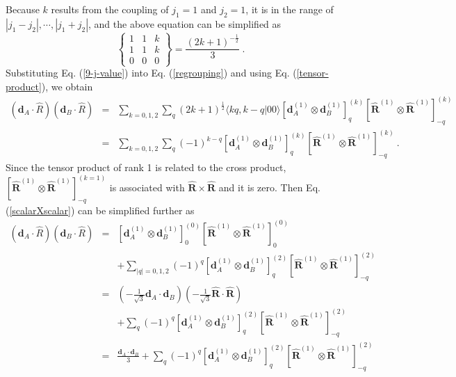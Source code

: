 Because $k$ results from the coupling of $j_{1}=1$ and $j_{2}=1$, it is in the range of $|j_{1}-j_{2}|, \cdots, |j_{1}+j_{2}|$, and the above equation can be simplified as
\begin{equation}
\left\{
\begin{array}{ccc}
1& 1&k \\
1&1&k \\
0&0&0 
\end{array}
\right\} = \frac{(2k + 1)^{-\frac{1}{2}}}{3} \ . \label{9-j-value}
\end{equation}  
Substituting Eq. (\ref{9-j-value}) into Eq. (\ref{regrouping}) and using Eq. (\ref{tensor-product}), we obtain
\begin{eqnarray}
(\mathbf{d}_{A}\cdot\hat{R})(\mathbf{d}_{B}\cdot\hat{R})&=&\sum_{k=0,1,2}\sum_{q}(2k+1)^{\frac{1}{2}}\langle k q, k -q | 00 \rangle\left[ \mathbf{d}_{A}^{(1)} \otimes \mathbf{d}_{B}^{(1)} \right]^{(k)}_{q} \left[ \mathbf{\hat{R}}^{(1)} \otimes \mathbf{\hat{R}}^{(1)} \right]^{(k)}_{-q}    \nonumber \\
&=& \sum_{k=0,1,2}\sum_{q} (-1)^{k-q} \left[ \mathbf{d}_{A}^{(1)} \otimes \mathbf{d}_{B}^{(1)} \right]^{(k)}_{q} \left[ \mathbf{\hat{R}}^{(1)} \otimes \mathbf{\hat{R}}^{(1)} \right]^{(k)}_{-q} \ . \label{scalarXscalar}
\end{eqnarray}
Since the tensor product of rank 1 is related to the cross product, $\left[ \mathbf{\hat{R}}^{(1)} \otimes \mathbf{\hat{R}}^{(1)} \right]^{(k=1)}_{-q}$ is associated with $\mathbf{\hat{R}}\times\mathbf{\hat{R}}$ and it is zero. Then Eq. (\ref{scalarXscalar}) can be simplified further as
\begin{eqnarray}
(\mathbf{d}_{A}\cdot\hat{R})(\mathbf{d}_{B}\cdot\hat{R})&=&\left[ \mathbf{d}_{A}^{(1)} \otimes \mathbf{d}_{B}^{(1)} \right]^{(0)}_{0} \left[ \mathbf{\hat{R}}^{(1)} \otimes \mathbf{\hat{R}}^{(1)} \right]^{(0)}_{0} \nonumber \\
& & + \sum_{|q|=0,1,2} (-1)^{q} \left[ \mathbf{d}_{A}^{(1)} \otimes \mathbf{d}_{B}^{(1)} \right]^{(2)}_{q} \left[ \mathbf{\hat{R}}^{(1)} \otimes \mathbf{\hat{R}}^{(1)} \right]^{(2)}_{-q} \nonumber \\
&=& (-\frac{1}{\sqrt{3}} \mathbf{d}_{A}\cdot \mathbf{d}_{B})(-\frac{1}{\sqrt{3}}\mathbf{\hat{R}}\cdot\mathbf{\hat{R}} ) \nonumber \\
& & +  \sum_{q} (-1)^{q} \left[ \mathbf{d}_{A}^{(1)} \otimes \mathbf{d}_{B}^{(1)} \right]^{(2)}_{q} \left[ \mathbf{\hat{R}}^{(1)} \otimes \mathbf{\hat{R}}^{(1)} \right]^{(2)}_{-q} \nonumber \\
&=& \frac{\mathbf{d}_{A}\cdot \mathbf{d}_{B}}{3}+  \sum_{q} (-1)^{q} \left[ \mathbf{d}_{A}^{(1)} \otimes \mathbf{d}_{B}^{(1)} \right]^{(2)}_{q} \left[ \mathbf{\hat{R}}^{(1)} \otimes \mathbf{\hat{R}}^{(1)} \right]^{(2)}_{-q} \nonumber \\ 
\label{term2}
\end{eqnarray}
